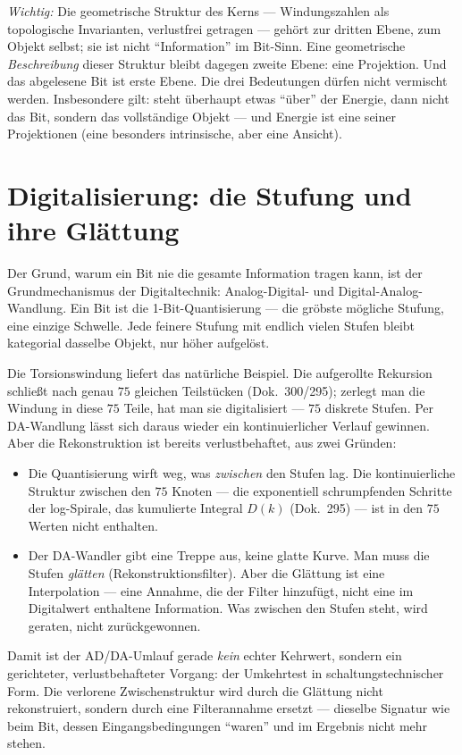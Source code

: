 \emph{Wichtig:} Die geometrische Struktur des Kerns --- Windungszahlen als
topologische Invarianten, verlustfrei getragen --- gehört zur dritten Ebene, zum
Objekt selbst; sie ist nicht \enquote{Information} im Bit-Sinn. Eine geometrische
\emph{Beschreibung} dieser Struktur bleibt dagegen zweite Ebene: eine Projektion.
Und das abgelesene Bit ist erste Ebene. Die drei Bedeutungen dürfen nicht
vermischt werden. Insbesondere gilt: steht überhaupt etwas \enquote{über} der
Energie, dann nicht das Bit, sondern das vollständige Objekt --- und Energie ist
eine seiner Projektionen (eine besonders intrinsische, aber eine Ansicht).

\section{Digitalisierung: die Stufung und ihre Glättung}

Der Grund, warum ein Bit nie die gesamte Information tragen kann, ist der
Grundmechanismus der Digitaltechnik: Analog-Digital- und Digital-Analog-Wandlung.
Ein Bit ist die 1-Bit-Quantisierung --- die gröbste mögliche Stufung, eine
einzige Schwelle. Jede feinere Stufung mit endlich vielen Stufen bleibt
kategorial dasselbe Objekt, nur höher aufgelöst.

Die Torsionswindung liefert das natürliche Beispiel. Die aufgerollte Rekursion
schließt nach genau $75$ gleichen Teilstücken (Dok.~300/295); zerlegt man die
Windung in diese $75$ Teile, hat man sie digitalisiert --- $75$ diskrete Stufen.
Per DA-Wandlung lässt sich daraus wieder ein kontinuierlicher Verlauf gewinnen.
Aber die Rekonstruktion ist bereits verlustbehaftet, aus zwei Gründen:
\begin{itemize}
  \item Die Quantisierung wirft weg, was \emph{zwischen} den Stufen lag. Die
    kontinuierliche Struktur zwischen den $75$ Knoten --- die exponentiell
    schrumpfenden Schritte der log-Spirale, das kumulierte Integral $D(k)$
    (Dok.~295) --- ist in den $75$ Werten nicht enthalten.
  \item Der DA-Wandler gibt eine Treppe aus, keine glatte Kurve. Man muss die
    Stufen \emph{glätten} (Rekonstruktionsfilter). Aber die Glättung ist eine
    Interpolation --- eine Annahme, die der Filter hinzufügt, nicht eine im
    Digitalwert enthaltene Information. Was zwischen den Stufen steht, wird
    geraten, nicht zurückgewonnen.
\end{itemize}
Damit ist der AD/DA-Umlauf gerade \emph{kein} echter Kehrwert, sondern ein
gerichteter, verlustbehafteter Vorgang: der Umkehrtest in schaltungstechnischer
Form. Die verlorene Zwischenstruktur wird durch die Glättung nicht
rekonstruiert, sondern durch eine Filterannahme ersetzt --- dieselbe Signatur wie
beim Bit, dessen Eingangsbedingungen \enquote{waren} und im Ergebnis nicht mehr
stehen.

